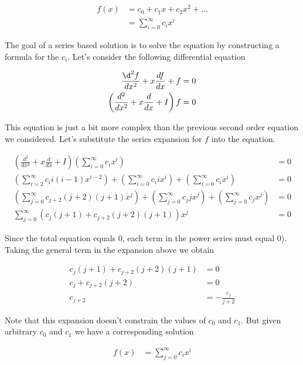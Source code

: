 \documentclass[book.tex]{subfiles}
\begin{document}
\begin{align}
    f(x) &= c_0 + c_1 x + c_2 x^2 + \dotsc \\
    &= \sum_{i=0}^\infty c_i x^i
\end{align}

The goal of a series based solution is to solve the equation by constructing a formula for the $c_i$. Let's consider the following differential equation

\begin{align}
    \frac{\d^2 f}{d x^2} + x \frac{df}{dx} + f &= 0 \\
    \left ( \frac{d^2}{dx^2} + x \frac{d}{dx} + I \right ) f  &= 0
\end{align}

This equation is just a bit more complex than the previous second order equation we considered. Let's substitute the series expansion for $f$ into the equation.

\begin{align}
    \left ( \frac{d^2}{dx^2} + x \frac{d}{dx} + I \right ) \left ( \sum_{i=0}^\infty  c_i x^i \right) &= 0 \\ 
    \left ( \sum_{i=2}^\infty c_i i (i-1) x^{i-2}  \right ) + \left ( \sum_{i=0}^\infty c_i i x^{i} \right) + \left ( \sum_{i=0}^\infty c_i x^i \right) &= 0 \\
    \left ( \sum_{j=0}^\infty c_{j+2} (j+2)(j+1) x^{j}  \right ) + \left ( \sum_{j=0}^\infty c_{j} j x^{j} \right) + \left ( \sum_{j=0}^\infty c_j x^j \right) &= 0  \\
    \sum_{j=0}^{\infty} (c_j(j+1) + c_{j+2}(j+2)(j+1)) x^j &= 0
\end{align}

Since the total equation equals $0$, each term in the power series must equal $0$). Taking the general term in the expansion above we obtain 

\begin{align}
    c_j(j+1) + c_{j+2}(j+2)(j+1) &= 0 \\
    c_j + c_{j+2}(j+2) &= 0 \\
    c_{j+2} &= -\frac{c_j}{j+2}
\end{align}

Note that this expansion doesn't constrain the values of $c_0$ and $c_1$. But given arbitrary $c_0$ and $c_1$ we have a corresponding solution

\begin{align}
    f(x) &= \sum_{j=0}^\infty c_i x^i
\end{align}
\end{document}
